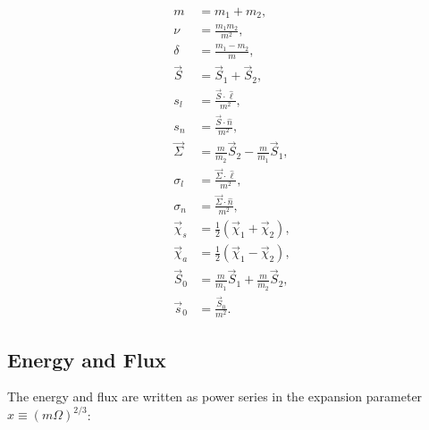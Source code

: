 \begin{align}
m &= m_{1}+m_{2},\\
\nu &= \frac{m_{1}m_{2}}{m^{2}},\\
\delta &= \frac{m_{1}-m_{2}}{m},\\
\vec{S} &= \vec{S}_{1}+\vec{S}_{2},\\
s_{l} &= \frac{\vec{S}\cdot\hat\ell}{m^{2}},\\
s_{n} &= \frac{\vec{S}\cdot\hat n}{m^{2}},\\
\vec{\Sigma} &= \frac{m}{m_2}\vec{S}_{2} - \frac{m}{m_1}\vec{S}_{1},\\
\sigma_{l} &=\frac{\vec\Sigma\cdot\hat\ell}{m^{2}}, \\
\sigma_{n} &= \frac{\vec\Sigma\cdot\hat n}{m^{2}}, \\
\vec{\chi}_{s} &= \frac{1}{2}\left(\vec{\chi}_{1}+\vec{\chi}_{2}\right),\\
\vec{\chi}_{a} &= \frac{1}{2}\left(\vec{\chi}_{1}-\vec{\chi}_{2}\right),\\
\vec{S}_0 & = \frac{m}{m_1}\vec{S}_{1}+\frac{m}{m_2}\vec{S}_{2},\\
\vec{s}_0 & = \frac{\vec{S}_0}{m^2}.
\end{align}


\subsection{Energy and Flux}
\label{ap:energyFlux}

The energy and flux are written as power series in the expansion
parameter $x\equiv (m\Omega)^{2/3}$:


